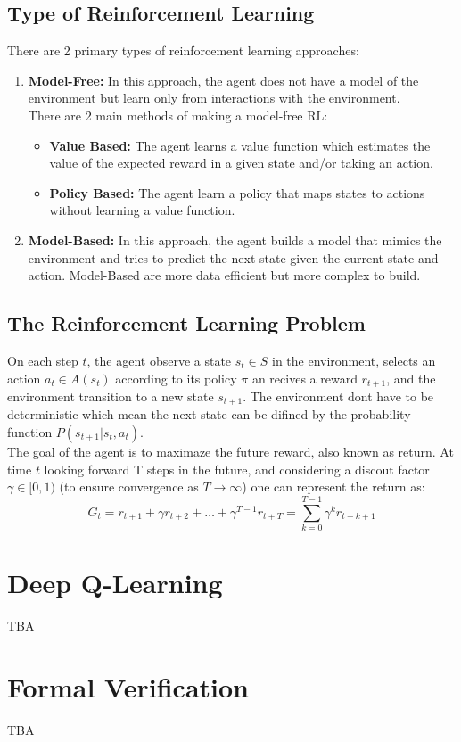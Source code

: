 \documentclass[12pt,a4paper]{report}
\begin{document}
\subsection{Type of Reinforcement Learning}
There are 2 primary types of reinforcement learning approaches:
\begin{enumerate}
    \item[] \textbf{Model-Free:} In this approach, the agent does not have a model of the environment but learn only from interactions with the environment.\\
    There are 2 main methods of making a model-free RL:
    \begin{itemize}
        \item \textbf{Value Based:} The agent learns a value function which estimates the value of the expected reward in a given state and/or taking an action.
        \item \textbf{Policy Based:} The agent learn a policy that maps states to actions without learning a value function. 
    \end{itemize}
    \item[] \textbf{Model-Based:} In this approach, the agent builds a model that mimics the environment and tries to predict the next state given the current state and action. Model-Based are more data efficient but more complex to build.
\end{enumerate}
\subsection{The Reinforcement Learning Problem}
On each step $t$, the agent observe a state $s_t\in S$ in the environment, selects an action $a_t\in A(s_t)$ according to its policy $\pi$ an recives a reward $r_{t+1}$, and the environment transition to a new state $s_{t+1}$. The environment dont have to be deterministic which mean the next state can be difined by the probability function $P(s_{t+1}|s_t,a_t)$.\\
The goal of the agent is to maximaze the future reward, also known as return. At time $t$ looking forward T steps in the future, and considering a discout factor $\gamma{\in}[0,1)$ (to ensure convergence as $T{\rightarrow}\infty$) one can represent the return as: $$G_t = r_{t+1} + {\gamma}r_{t+2}+\dots+{\gamma}^{T-1}r_{t+T}=\sum_{k=0}^{T-1}\gamma^{k}r_{t+k+1}$$
\section{Deep Q-Learning}
TBA
\section{Formal Verification}
TBA
\end{document}
